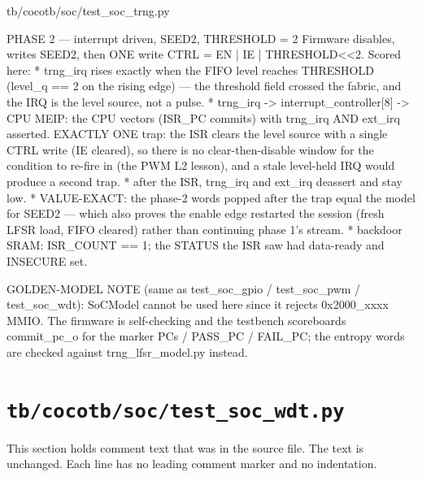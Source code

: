 \begin{relocated}{tb/cocotb/soc/test_soc_trng.py}
\begin{textblock}
PHASE 2 — interrupt driven, SEED2, THRESHOLD = 2
Firmware disables, writes SEED2, then ONE write CTRL = EN | IE | THRESHOLD<<2. Scored here:
* trng_irq rises exactly when the FIFO level reaches THRESHOLD (level_q == 2 on the rising
edge) — the threshold field crossed the fabric, and the IRQ is the level source, not a
pulse.
* trng_irq -> interrupt_controller[8] -> CPU MEIP: the CPU vectors (ISR_PC commits) with
trng_irq AND ext_irq asserted. EXACTLY ONE trap: the ISR clears the level source with a
single CTRL write (IE cleared), so there is no clear-then-disable window for the condition
to re-fire in (the PWM L2 lesson), and a stale level-held IRQ would produce a second trap.
* after the ISR, trng_irq and ext_irq deassert and stay low.
* VALUE-EXACT: the phase-2 words popped after the trap equal the model for SEED2 — which also
proves the enable edge restarted the session (fresh LFSR load, FIFO cleared) rather than
continuing phase 1's stream.
* backdoor SRAM: ISR_COUNT == 1; the STATUS the ISR saw had data-ready and INSECURE set.

GOLDEN-MODEL NOTE (same as test_soc_gpio / test_soc_pwm / test_soc_wdt): SoCModel cannot be used
here since it rejects 0x2000_xxxx MMIO. The firmware is self-checking and the testbench
scoreboards commit_pc_o for the marker PCs / PASS_PC / FAIL_PC; the entropy words are checked
against trng_lfsr_model.py instead.
\end{textblock}

\end{relocated}

\section{\texttt{tb/cocotb/soc/test\_soc\_wdt.py}}\label{tm:suite:soc-test-soc-wdt}

This section holds comment text that was in the source file. The text is unchanged. Each line has no leading comment marker and no indentation.

